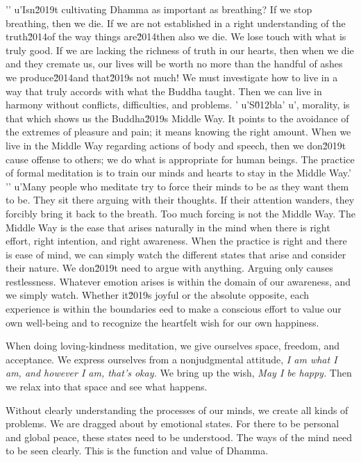 '\n'
u'Isn\u2019t cultivating Dhamma as important as breathing? If we stop breathing, then we die. If we are not established in a right understanding of the truth\u2014of the way things are\u2014then also we die. We lose touch with what is truly good. If we are lacking the richness of truth in our hearts, then when we die and they cremate us, our lives will be worth no more than the handful of ashes we produce\u2014and that\u2019s not much! We must investigate how to live in a way that truly accords with what the Buddha taught. Then we can live in harmony without conflicts, difficulties, and problems. '
u'S\u012bla'
u', morality, is that which shows us the Buddha\u2019s Middle Way. It points to the avoidance of the extremes of pleasure and pain; it means knowing the right amount. When we live in the Middle Way regarding actions of body and speech, then we don\u2019t cause offense to others; we do what is appropriate for human beings. The practice of formal meditation is to train our minds and hearts to stay in the Middle Way.'
'\n'
u'Many people who meditate try to force their minds to be as they want them to be. They sit there arguing with their thoughts. If their attention wanders, they forcibly bring it back to the breath. Too much forcing is not the Middle Way. The Middle Way is the ease that arises naturally in the mind when there is right effort, right intention, and right awareness. When the practice is right and there is ease of mind, we can simply watch the different states that arise and consider their nature. We don\u2019t need to argue with anything. Arguing only causes restlessness. Whatever emotion arises is within the domain of our awareness, and we simply watch. Whether it\u2019s joyful or the absolute opposite, each experience is within the boundaries eed to make a 
conscious effort to value our own well-being and to recognize the 
heartfelt wish for our own happiness.

When doing loving-kindness meditation, we give ourselves space, 
freedom, and acceptance. We express ourselves from a nonjudgmental 
attitude, \emph{I am what I am, and however I am, that's okay.} We 
bring up the wish, \emph{May I be happy.} Then we relax into that space 
and see what happens.


Without clearly understanding the processes of our minds, we create all 
kinds of problems. We are dragged about by emotional states. For there 
to be personal and global peace, these states need to be understood. 
The ways of the mind need to be seen clearly. This is the function and 
value of Dhamma.

